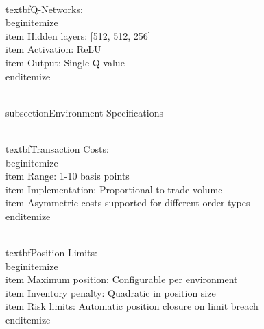 \documentclass[11pt,a4paper]{article}
\begin{document}
\\textbf{Q-Networks}:
\\begin{itemize}
\\item Hidden layers: [512, 512, 256]
\\item Activation: ReLU
\\item Output: Single Q-value
\\end{itemize}

\\subsection{Environment Specifications}

\\textbf{Transaction Costs}:
\\begin{itemize}
\\item Range: 1-10 basis points
\\item Implementation: Proportional to trade volume
\\item Asymmetric costs supported for different order types
\\end{itemize}

\\textbf{Position Limits}:
\\begin{itemize}
\\item Maximum position: Configurable per environment
\\item Inventory penalty: Quadratic in position size
\\item Risk limits: Automatic position closure on limit breach
\\end{itemize}

\
\end{document}
